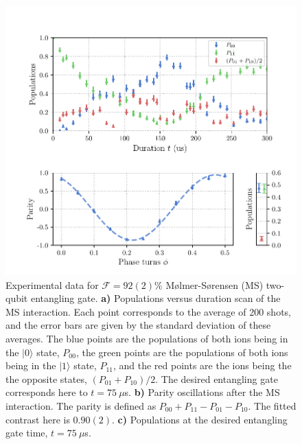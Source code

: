     \begin{figure}
        \begin{center}
        \noindent\includegraphics[width=\linewidth]{
            figures/pdf_figure/ms_gate.pdf
            }
        \end{center}
        \caption{
            Experimental data for $\mathcal{F}=92(2)$\% Mølmer-Sørensen (MS) two-qubit entangling gate.
            \textbf{a)} Populations versus duration scan of the MS interaction.
            Each point corresponds to the average of 200 shots, and the error
            bars are given by the standard deviation of these averages. The blue
            points are the populations of both ions being in the $|0\rangle$
            state, $P_{00}$, the green points are the populations of both ions
            being in the $|1\rangle$ state, $P_{11}$, and the red points are the
            ions being the the opposite states, $(P_{01}+P_{10})/2$. The desired
            entangling gate corresponds here to $t =  75~\mu$s. 
            \textbf{b)} Parity oscillations after the MS interaction. The parity
            is defined as $P_{00} + P_{11} - P_{01} - P_{10}$. The fitted
            contrast here is $0.90(2)$.
            \textbf{c)} Populations at the desired entangling gate time, $t =
            75~\mu$s.  
            }
        \label{fig:ms_gate}
    \end{figure}

